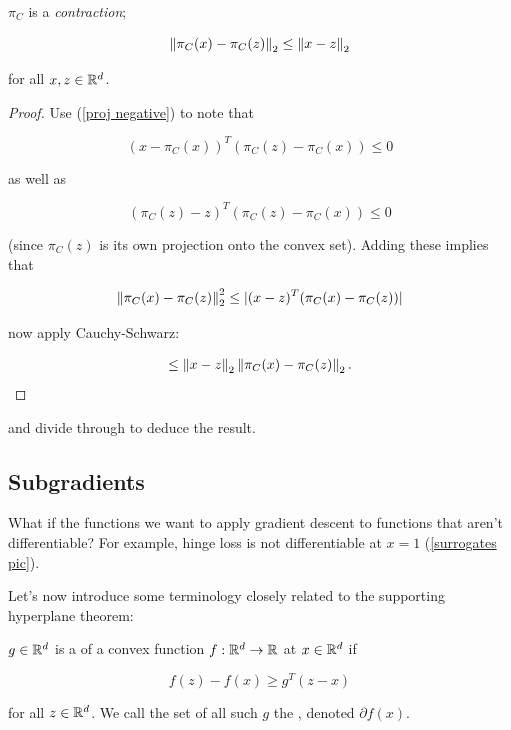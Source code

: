 \documentclass[11pt]{scrartcl}
\begin{document}
\begin{theorem}
\label{projection is contraction}
$\pi_C$ is a \textit{contraction};

\begin{equation}
    \left\lVert\pi_C(x) - \pi_C(z)\right\rVert_2 \le \left\lVert x-z\right\rVert_2
\end{equation}

for all $x,z \in \mathbb R^d$.

\begin{proof}
Use (\ref{proj negative}) to note that 

\begin{equation}
    (x - \pi_C(x))^T (\pi_C(z) - \pi_C(x)) \le 0
\end{equation}

as well as 

\begin{equation}
    (\pi_C(z) - z)^T (\pi_C(z) - \pi_C(x)) \le 0
\end{equation}

(since $\pi_C(z)$ is its own projection onto the convex set). Adding these implies that

\begin{equation}
    \left\lVert\pi_C(x) - \pi_C(z)\right\rVert_2^2 \le |(x-z)^T (\pi_C(x) - \pi_C(z))|
\end{equation}

now apply Cauchy-Schwarz:

\begin{align}
    \le \left\lVert x-z\right\rVert_2 \left\lVert\pi_C(x) - \pi_C(z)\right\rVert_2.
\end{align}
\end{proof}

and divide through to deduce the result.
\end{theorem}

\subsection{Subgradients}
\label{subgradient_section}

What if the functions we want to apply gradient descent to functions that aren't differentiable? For example, hinge loss is not differentiable at $x=1$ (\ref{surrogates pic}).

Let's now introduce some terminology closely related to the supporting hyperplane theorem:

\begin{definition}
$g \in \mathbb R^d$ is a  of a convex function $f : \mathbb R^d \rightarrow \mathbb R$ at $x \in \mathbb R^d$ if

\begin{equation}
    f(z) - f(x) \ge g^T (z-x)
\end{equation}

for all $z \in \mathbb R^d$. We call the set of all such $g$ the , denoted $\partial f(x)$.
\end{definition}
\end{document}
